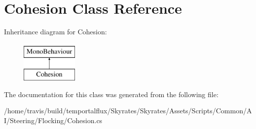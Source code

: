 \hypertarget{class_cohesion}{\section{Cohesion Class Reference}
\label{class_cohesion}
}
Inheritance diagram for Cohesion\-:\begin{figure}[H]
\begin{center}
\leavevmode
\includegraphics[height=2.000000cm]{class_cohesion}
\end{center}
\end{figure}


The documentation for this class was generated from the following file\-:\begin{DoxyCompactItemize}
\item 
/home/travis/build/temportalflux/\-Skyrates/\-Skyrates/\-Assets/\-Scripts/\-Common/\-A\-I/\-Steering/\-Flocking/Cohesion.\-cs\end{DoxyCompactItemize}
